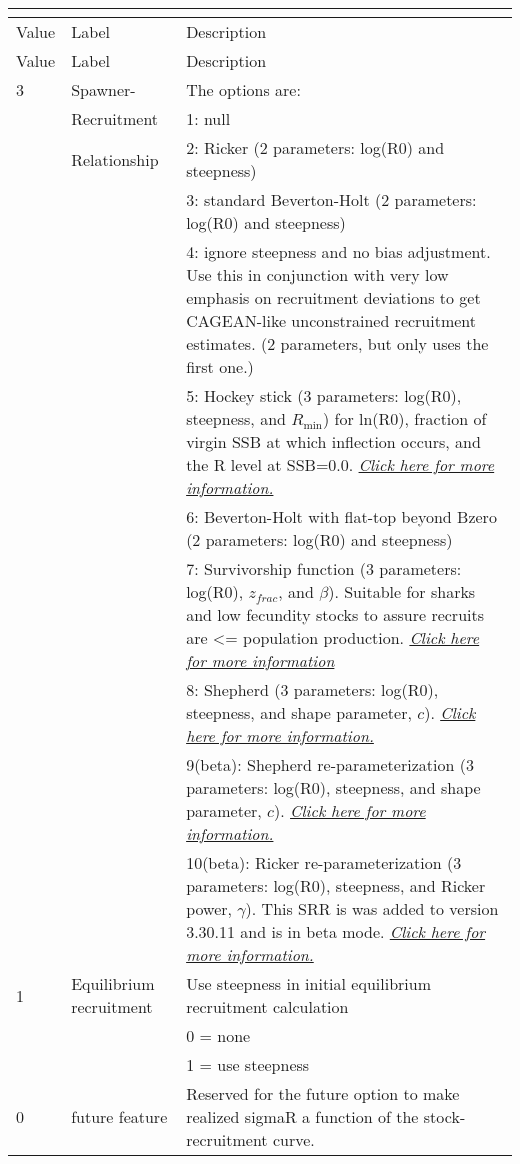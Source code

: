 \begin{center}
	\begin{longtable}{p{1cm} p{3cm} p{11cm}}
		\multicolumn{3}{l}{ }\\
		\hline
		Value & Label &  Description\\
		\hline
		\endfirsthead

		\hline
		Value & Label &  Description\\
		\hline
		\endhead

		\endfoot
		\endlastfoot

		3 & Spawner-            & The options are: \\
		  & Recruitment         & 1: null \\
		  & Relationship        & 2:  Ricker (2 parameters: log(R0) and steepness) \\
		  &                     & 3:  standard Beverton-Holt (2 parameters: log(R0) and steepness) \\
		  &                     & 4:  ignore steepness and no bias adjustment.  Use this in conjunction with very low emphasis on recruitment deviations to get CAGEAN-like unconstrained recruitment estimates. (2 parameters, but only uses the first one.)\\
		  &                     & 5:  Hockey stick (3 parameters: log(R0), steepness, and $R_{\text{min}}$) for ln(R0), fraction of virgin SSB at which inflection occurs, and the R level at SSB=0.0. \hyperlink{Hockey}{\textit{Click here for more information.}}\\
		  &                     & 6:  Beverton-Holt with flat-top beyond Bzero (2 parameters: log(R0) and steepness)\\
		  &                     & 7:  Survivorship function (3 parameters: log(R0), $z_{frac}$, and $\beta$).  Suitable for sharks and low fecundity stocks to assure recruits are <= population production. \hyperlink{Survivorship}{\textit{Click here for more information}}\\
	      &                     & 8:  Shepherd (3 parameters: log(R0), steepness, and shape parameter, $c$). \hyperlink{Shepherd}{\textit{Click here for more information.}}\\
	      & 					& 9(beta): Shepherd re-parameterization (3 parameters: log(R0), steepness, and shape parameter, $c$). \hyperlink{Shepherd2}{\textit{Click here for more information.}}\\
	      & 					& 10(beta): Ricker re-parameterization (3 parameters: log(R0), steepness, and Ricker power, $\gamma$). This SRR is was added to version 3.30.11 and is in beta mode. \hyperlink{Ricker2}{\textit{Click here for more information.}}\\
	    \hline
	    1 & Equilibrium recruitment & Use steepness in initial equilibrium recruitment calculation \\
	      & 						& 0 = none \\
	      &							& 1 = use steepness \\
	    0 &  future feature         & Reserved for the future option to make realized sigmaR a function of the stock-recruitment curve.  \\ 
	    \hline
	\end{longtable}
\end{center}
